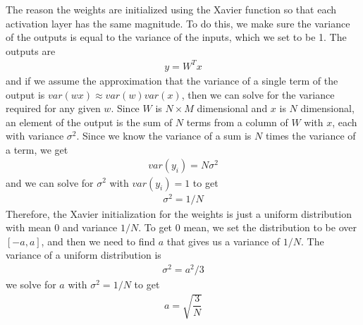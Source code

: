 \documentclass{article}
\begin{document}
The reason the weights are initialized using the Xavier function so that each activation layer has the same magnitude. To do this, we make sure the variance of the outputs is equal to the variance of the inputs, which we set to be 1. The outputs are 
\begin{align}
	y = W^Tx
\end{align}
and if we assume the approximation that the variance of a single term of the output is $var(wx) \approx var(w)var(x)$, then we can solve for the variance required for any given $w$. Since $W$ is $N\times M$ dimensional and $x$ is $N$ dimensional, an element of the output is the sum of $N$ terms from a column of $W$ with $x$, each with variance $\sigma^2$. Since we know the variance of a sum is $N$ times the variance of a term, we get 
\begin{align}
	var(y_i) = N\sigma^2
\end{align}
and we can solve for $\sigma^2$ with $var(y_i) = 1$ to get
\begin{align}
	\sigma^2 = 1/N
\end{align}
Therefore, the Xavier initialization for the weights is just a uniform distribution with mean 0 and variance $1/N$. To get 0 mean, we set the distribution to be over $[-a, a]$, and then we need to find $a$ that gives us a variance of $1/N$. The variance of a uniform distribution is 
\begin{align}
	\sigma^2 = a^2/3
\end{align}
we solve for $a$ with $\sigma^2 = 1/N$ to get
\begin{align}
	a = \sqrt{\dfrac{3}{N}}
\end{align}
\end{document}
